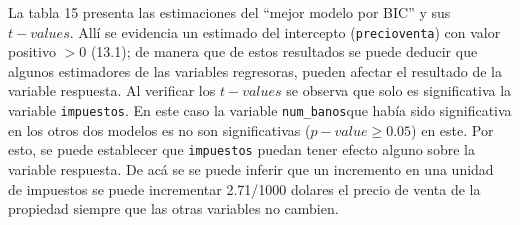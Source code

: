 \documentclass[
]{article}
\begin{document}
La tabla 15 presenta las estimaciones del ``mejor modelo por BIC'' y sus
\(t-values\). Allí se evidencia un estimado del intercepto
(\texttt{precioventa}) con valor positivo \(> 0\) (13.1); de manera que
de estos resultados se puede deducir que algunos estimadores de las
variables regresoras, pueden afectar el resultado de la variable
respuesta. Al verificar los \(t-values\) se observa que solo es
significativa la variable \texttt{impuestos}. En este caso la variable
\texttt{num\_banos}que había sido significativa en los otros dos modelos
es no son significativas (\(p - value \geq 0.05\)) en este. Por esto, se
puede establecer que \texttt{impuestos} puedan tener efecto alguno sobre
la variable respuesta. De acá se se puede inferir que un incremento en
una unidad de impuestos se puede incrementar 2.71/1000 dolares el precio
de venta de la propiedad siempre que las otras variables no cambien.
\end{document}
